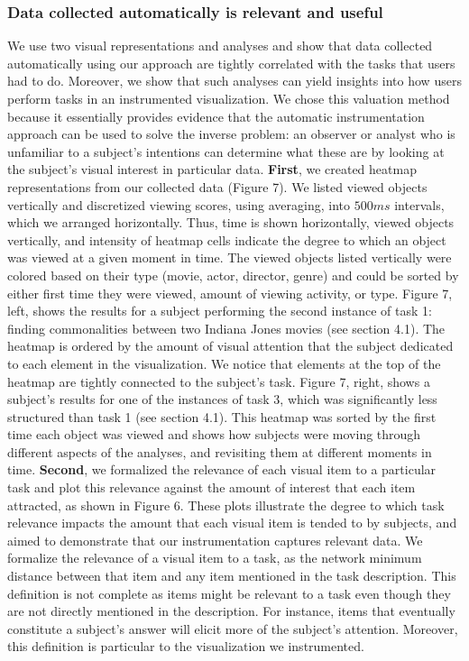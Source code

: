 \subsubsection{Data collected automatically is relevant and useful}
\label{sec:EvalDataCollected}
We use two visual representations and analyses and show that data collected automatically using our approach are tightly correlated with the tasks that users had to do. Moreover, we show that such analyses can yield insights into how users perform tasks in an instrumented visualization. We chose this valuation method because it essentially provides evidence that the automatic instrumentation approach can be used to solve the inverse problem: an observer or analyst who is unfamiliar to a subject's intentions can determine what these are by looking at the subject's visual interest in particular data. 
\textbf{First}, we created heatmap representations from our collected data (Figure 7). We listed viewed objects vertically and discretized viewing scores, using averaging, into $500ms$ intervals, which we arranged horizontally. Thus, time is shown horizontally, viewed objects vertically, and intensity of heatmap cells indicate the degree to which an object was viewed at a given moment in time. The viewed objects listed vertically were colored based on their type (movie, actor, director, genre) and could be sorted by either first time they were viewed, amount of viewing activity, or type. 
Figure 7, left, shows the results for a subject performing the second instance of task 1: finding commonalities between two Indiana Jones movies (see section 4.1). The heatmap is ordered by the amount of visual attention that the subject dedicated to each element in the visualization. We notice that elements at the top of the heatmap are tightly connected to the subject's  task.   
Figure 7, right, shows a subject's results for one of the instances of task 3, which was significantly less structured than task 1 (see section 4.1). This heatmap  was sorted by the first time each object was viewed and shows how subjects were moving through different aspects of the analyses, and revisiting them at different moments in time. 
\textbf{Second}, we formalized the relevance of each visual item to a particular task and plot this relevance against the amount of interest that each item attracted, as shown in Figure 6. These plots illustrate the degree to which task relevance impacts the amount that each visual item is tended to by subjects, and aimed to demonstrate that our instrumentation captures relevant data.  
We formalize the relevance of a visual item to a task, as the network minimum distance between that item and any item mentioned in the task description.  This definition is not complete as items might be relevant to a task even though they are not directly mentioned in the description.  For instance, items that eventually constitute a subject's answer will elicit more of the subject's attention. Moreover, this definition is particular to the visualization we instrumented.

